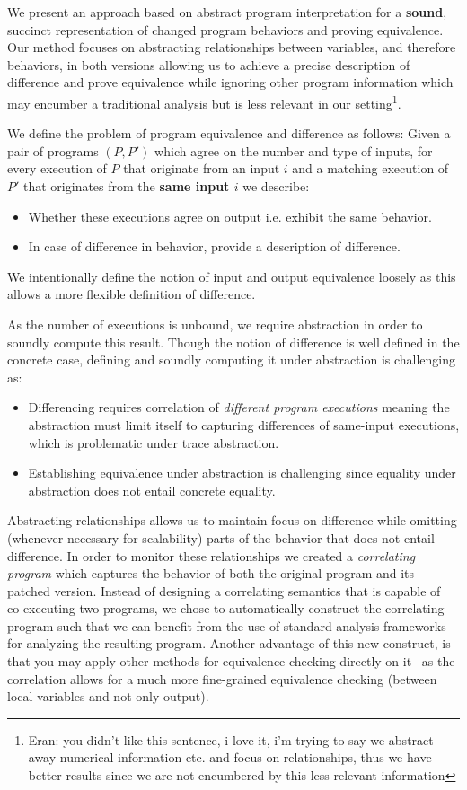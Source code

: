 We present an approach based on abstract program interpretation for a \textbf{sound}, succinct representation of changed program behaviors and proving equivalence. Our method focuses on abstracting relationships between variables, and therefore behaviors, in both versions allowing us to achieve a precise description of difference and prove equivalence while ignoring other program information which may encumber a traditional analysis but is less relevant in our setting\footnote[1]{Eran: you didn't like this sentence, i love it, i'm trying to say we abstract away numerical information etc. and focus on relationships, thus we have better results since we are not encumbered by this less relevant information}.

We define the problem of program equivalence and difference as follows: Given a pair of programs $(P,P')$ which agree on the number and type of inputs, for every execution of $P$ that originate from an input $i$ and a matching execution of $P'$ that originates from the \textbf{same input $i$} we describe:
\begin{itemize}
\item Whether these executions agree on output i.e. exhibit the same behavior.
\item In case of difference in behavior, provide a description of difference.
\end{itemize}
We intentionally define the notion of input and output equivalence loosely as this allows a more flexible definition of difference.

As the number of executions is unbound, we require abstraction in order to soundly compute this result. Though the notion of difference is well defined in the concrete case, defining and soundly computing it under abstraction is challenging as:
\begin{itemize}
\item Differencing requires correlation of \emph{different program executions} meaning the abstraction must limit itself to capturing differences of same-input executions, which is problematic under trace abstraction.
\item Establishing equivalence under abstraction is challenging since equality under abstraction does not entail concrete equality.
\end{itemize}

Abstracting relationships allows us to maintain focus on difference while
omitting (whenever necessary for scalability) parts of the behavior that does
not entail difference. In order to monitor these relationships we created a
\emph{correlating program} which captures the behavior of both the original
program and its patched version. Instead of designing a correlating semantics
that is capable of co-executing two programs, we chose to automatically
construct the correlating program such that we can benefit from the use of
standard analysis frameworks for analyzing the resulting program. Another
advantage of this new construct, is that you may apply other methods for
equivalence checking directly on it~\cite{EnglerRamos11} as the correlation
allows for a much more fine-grained equivalence checking (between local
variables and not only output).

